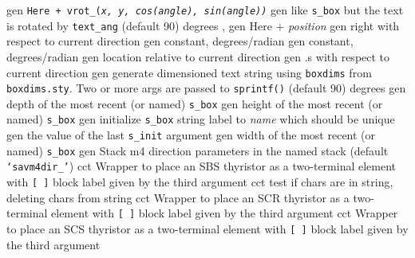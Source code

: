   {gen}
  {\tt Here + vrot\_({\sl x, y, cos(angle), sin(angle))}}
  {gen}
  {like {\tt s\_box} but the text is rotated by {\tt text\_ang}
   (default 90) degrees , }
  {gen}
  {Here + {\sl position}}
  {gen}
  {right with respect to current direction}
  {gen}
  {constant, degrees/radian}
  {gen}
  {constant, degrees/radian}
  {gen}
  {location relative to current direction}
%
  {gen}
  {.s with respect to current direction}
  {gen}
  {generate dimensioned text string using {\tt{}boxdims} from
    {\tt boxdims.sty}. Two or more args are passed to {\tt sprintf()}
   (default 90) degrees }
  {gen}
  {depth of the most recent (or named) {\tt s\_box}
    }
  {gen}
  {height of the most recent (or named) {\tt s\_box}
    }
  {gen}
  {initialize {\tt s\_box} string label to {\sl name} which should be unique
    }
  {gen}
  {the value of the last {\tt s\_init} argument
    }
  {gen}
  {width of the most recent (or named) {\tt s\_box}
    }
  {gen}
  {Stack m4 direction parameters in the named stack
    (default {\tt `savm4dir\_'})}
  {cct}
  {Wrapper to place an SBS thyristor as a two-terminal element with
   {\tt [ ]} block label given by the third argument
    }
  {cct}
  {test if chars are in string, deleting chars from string}
  {cct}
  {Wrapper to place an SCR thyristor as a two-terminal element with
   {\tt [ ]} block label given by the third argument
    }
  {cct}
  {Wrapper to place an SCS thyristor as a two-terminal element with
   {\tt [ ]} block label given by the third argument
    }
